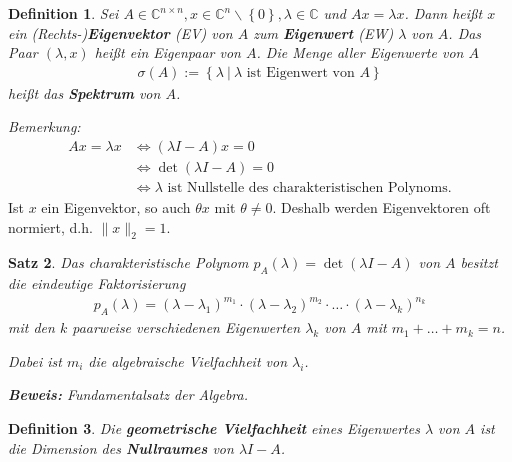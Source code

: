 \documentclass[%
a4paper,
11pt,		%
]
{scrartcl}
\theoremstyle{plain}
\newtheorem{mydef}{Definition}[section]
\theoremstyle{plain}
\newtheorem{mysatz}[mydef]{Satz}
\theoremstyle{plain}
\theoremstyle{plain}
\begin{document}
\begin{mydef}
Sei $A \in \mathbb{C}^{n \times n}, x \in \mathbb{C}^n \backslash \left\{ 0 \right\}, \lambda \in \mathbb{C}$ und $Ax = \lambda x$. Dann heißt $x$ ein (Rechts-)\textbf{Eigenvektor} (EV) von $A$ zum \textbf{Eigenwert} (EW) $\lambda$ von $A$. Das Paar $(\lambda, x)$ heißt ein Eigenpaar von $A$. Die Menge aller Eigenwerte von $A$
\begin{align*}
\sigma(A) := \left\{ \lambda \ | \ \lambda \text{ ist Eigenwert von } A \right\}
\end{align*}
heißt das \textbf{Spektrum} von $A$.
\end{mydef}
\textit{Bemerkung:}\\[-1.3cm] %
\begin{align*}
Ax = \lambda x & \Leftrightarrow (\lambda I - A)x = 0 \\
 & \Leftrightarrow \det(\lambda I - A)=0\\
 & \Leftrightarrow \lambda \text{ ist Nullstelle des charakteristischen Polynoms.}
\end{align*}
Ist $x$ ein Eigenvektor, so auch $\theta x$ mit $\theta \neq 0$. Deshalb werden Eigenvektoren oft normiert, d.h. $\| x \|_2=1$.\\

\begin{mysatz}
Das charakteristische Polynom $p_A(\lambda) = \det(\lambda I - A)$ von $A$ besitzt die eindeutige Faktorisierung
\begin{align*}
p_A(\lambda) = (\lambda - \lambda_1)^{m_1} \cdot (\lambda - \lambda_2)^{m_2} \cdot \ldots \cdot (\lambda - \lambda_k)^{n_k}
\end{align*}
mit den $k$ paarweise verschiedenen Eigenwerten $\lambda_k$ von $A$ mit $m_1 + \ldots + m_k = n$.

Dabei ist $m_i$ die algebraische Vielfachheit von $\lambda_i$.\newline

\textbf{Beweis:} Fundamentalsatz der Algebra.
\end{mysatz}

\begin{mydef}
  Die \textbf{geometrische Vielfachheit} eines Eigenwertes $\lambda$ von $A$ ist die Dimension des \textbf{Nullraumes} von $\lambda I -A$.
\end{mydef}

\newpage
\end{document}
